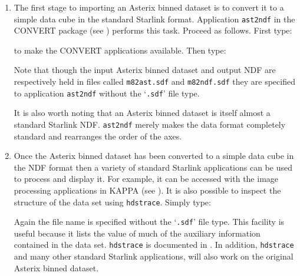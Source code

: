 \documentclass[twoside,11pt]{starlink}
\begin{document}
\begin{enumerate}

  \item The first stage to importing an Asterix binned dataset is to
   convert it to a simple data cube in the standard Starlink
    format.  Application \texttt{ast2ndf} in the CONVERT
   package (see \cite{SUN55}) performs this task.
   Proceed as follows.  First type:

\begin{terminalv}
\end{terminalv}

   to make the CONVERT applications available.  Then type:

\begin{terminalv}
\end{terminalv}

   Note that though the input Asterix binned dataset and output NDF are
   respectively
   held in files called \texttt{m82ast.sdf} and \texttt{m82ndf.sdf} they are
   specified to application \texttt{ast2ndf} without the `\texttt{.sdf}' file
   type.

   It is also worth noting that an Asterix binned dataset is itself
   almost a standard Starlink NDF.  \texttt{ast2ndf} merely makes the
   data format completely standard and rearranges the order of the
   axes.

  \item Once the Asterix binned dataset has been converted to a simple
   data cube in the NDF format then a variety of standard Starlink
   applications can be used to process and display it.  For example, it
   can be accessed with the image processing applications in KAPPA (see
   \cite{SUN95}).  It is also possible to inspect
   the structure of the data set using \texttt{hdstrace}.  Simply type:

\begin{terminalv}
\end{terminalv}

   Again the file name is specified without the `\texttt{.sdf}' file type.
   This facility is useful because it lists the value of much of the
   auxiliary information contained in the data set.  \texttt{hdstrace}
   is documented in \cite{SUN102}.  In addition,
   \texttt{hdstrace} and many other standard Starlink applications, will
   also work on the original Asterix binned dataset.


\end{enumerate}
\end{document}
